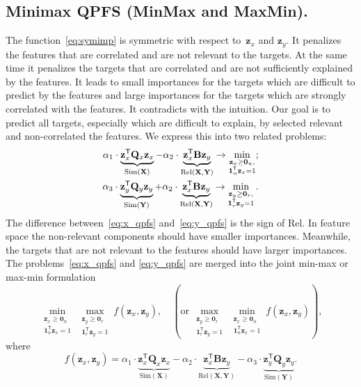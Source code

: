 \documentclass[12pt,oneside]{article}
\theoremstyle{definition}
\newcommand{\bz}{\mathbf{z}}
\newcommand{\bY}{\mathbf{Y}}
\newcommand{\bX}{\mathbf{X}}
\newcommand{\bB}{\mathbf{B}}
\newcommand{\bQ}{\mathbf{Q}}
\newcommand{\T}{\mathsf{T}}
\newcommand{\bOne}{\boldsymbol{1}}
\newcommand{\bZero}{\boldsymbol{0}}
\begin{document}
\subsection{Minimax QPFS (MinMax and MaxMin).}
The function~\eqref{eq:symimp} is symmetric with respect to~$\bz_x$ and $\bz_y$.
It penalizes the features that are correlated and are not relevant to the targets.
At the same time it penalizes the targets that are correlated and are not sufficiently explained by the features.
It leads to small importances for the targets which are difficult to predict by the features and large importances for the targets which are strongly correlated with the features.
It contradicts with the intuition.
Our goal is to predict all targets, especially which are difficult to explain, by selected relevant and non-correlated the features. We express this into two related problems:
\begin{align}
	\alpha_1 \cdot \underbrace{\bz_x^{\T} \bQ_x \bz_x}_{\text{Sim}(\bX)} - \alpha_2 \cdot \underbrace{\vphantom{()} \bz_x^{\T}\mathbf{B} \bz_y}_{\text{Rel}(\bX, \bY)} \rightarrow \min_{\substack{\bz_x \geq \bZero_n, \\ \bOne_n^{\T}\bz_x=1}};
	\label{eq:x_qpfs}\\
	\alpha_3 \cdot \underbrace{\bz_y^{\T} \bQ_y \bz_y}_{\text{Sim}(\bY)} + \alpha_2 \cdot \underbrace{\vphantom{()} \bz_x^{\T} \mathbf{B} \bz_y}_{\text{Rel}(\bX, \bY)} \rightarrow \min_{\substack{\bz_y \geq \bZero_r,  \\ \bOne_r^{\T}\bz_y=1}}.
	\label{eq:y_qpfs}
\end{align}
The difference between~\eqref{eq:x_qpfs} and~\eqref{eq:y_qpfs} is the sign of Rel.
In feature space the non-relevant components should have smaller importances.
Meanwhile, the targets that are not relevant to the features should have larger importances.
The problems~\eqref{eq:x_qpfs} and \eqref{eq:y_qpfs} are merged into the joint min-max or max-min formulation
\begin{equation}
	\min_{\substack{\bz_x \geq \bZero_n \\ \bOne_n^{\T}\bz_x=1}} 	\max_{\substack{\bz_y \geq \bZero_r \\ \bOne_r^{\T}\bz_y=1}} f(\bz_x, \bz_y), \quad \left(\text {or} \, \max_{\substack{\bz_y \geq \bZero_r \\ \bOne_r^{\T}\bz_y=1}} \min_{\substack{\bz_x \geq \bZero_n \\ \bOne_n^{\T}\bz_x=1}} f(\bz_x, \bz_y)\right),
	\label{eq:minmax}
\end{equation}
where
\begin{equation}
	f(\bz_x, \bz_y) = \alpha_1 \cdot \underbrace{\bz_x^{\T} \bQ_x \bz_x}_{\text{Sim}(\bX)} - \alpha_2 \cdot \underbrace{\bz_x^{\T} \bB \bz_y}_{\text{Rel}(\bX, \bY)} - \alpha_3 \cdot \underbrace{\bz_y^{\T} \bQ_y \bz_y}_{\text{Sim}(\bY)}.
\end{equation}
\end{document}
